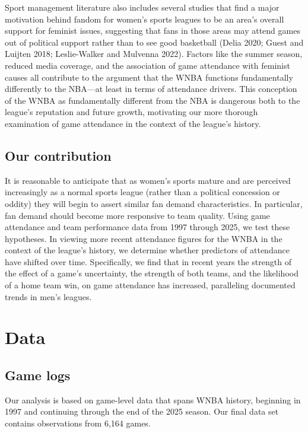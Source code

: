 \documentclass[
  letterpaper,
  DIV=11,
  numbers=noendperiod]{scrartcl}
\begin{document}
Sport management literature also includes several studies that find a
major motivation behind fandom for women's sports leagues to be an
area's overall support for feminist issues, suggesting that fans in
those areas may attend games out of political support rather than to see
good basketball (Delia 2020; Guest and Luijten 2018; Leslie-Walker and
Mulvenna 2022). Factors like the summer season, reduced media coverage,
and the association of game attendance with feminist causes all
contribute to the argument that the WNBA functions fundamentally
differently to the NBA---at least in terms of attendance drivers. This
conception of the WNBA as fundamentally different from the NBA is
dangerous both to the league's reputation and future growth, motivating
our more thorough examination of game attendance in the context of the
league's history.

\subsection{Our contribution}\label{our-contribution}

It is reasonable to anticipate that as women's sports mature and are
perceived increasingly as a normal sports league (rather than a
political concession or oddity) they will begin to assert similar fan
demand characteristics. In particular, fan demand should become more
responsive to team quality. Using game attendance and team performance
data from 1997 through 2025, we test these hypotheses. In viewing more
recent attendance figures for the WNBA in the context of the league's
history, we determine whether predictors of attendance have shifted over
time. Specifically, we find that in recent years the strength of the
effect of a game's uncertainty, the strength of both teams, and the
likelihood of a home team win, on game attendance has increased,
paralleling documented trends in men's leagues.

\section{Data}\label{sec-data}

\subsection{Game logs}\label{game-logs}

Our analysis is based on game-level data that spans WNBA history,
beginning in 1997 and continuing through the end of the 2025 season. Our
final data set contains observations from 6,164 games.
\end{document}
